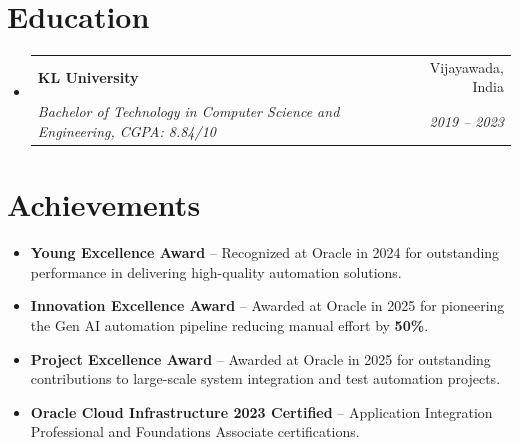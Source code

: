 \documentclass[letterpaper,11pt]{article}
\makeatletter
\newcommand{\resumeItem}[1]{
  \item\small{
    {#1 \vspace{-2pt}}
  }
}
\newcommand{\resumeSubheading}[4]{
  \vspace{-2pt}\item
    \begin{tabular*}{0.97\textwidth}[t]{l@{\extracolsep{\fill}}r}
      \textbf{#1} & #2 \\
      \textit{\small#3} & \textit{\small #4} \\
    \end{tabular*}\vspace{-7pt}
}
\newcommand{\resumeSubHeadingListStart}{\begin{itemize}[leftmargin=0.15in, label={}]}
\newcommand{\resumeSubHeadingListEnd}{\end{itemize}}
\newcommand{\resumeItemListStart}{\begin{itemize}}
\newcommand{\resumeItemListEnd}{\end{itemize}\vspace{-5pt}}
\makeatother
\begin{document}
\section{Education}
\resumeSubHeadingListStart
    \resumeSubheading
        {KL University}{Vijayawada, India}
        {Bachelor of Technology in Computer Science and Engineering, CGPA: 8.84/10}{2019 -- 2023}
\resumeSubHeadingListEnd

\section{Achievements}
\resumeItemListStart
    \resumeItem{\textbf{Young Excellence Award} -- Recognized at Oracle in 2024 for outstanding performance in delivering high-quality automation solutions.}
    \resumeItem{\textbf{Innovation Excellence Award} -- Awarded at Oracle in 2025 for pioneering the Gen AI automation pipeline reducing manual effort by \textbf{50\%}.}
    \resumeItem{\textbf{Project Excellence Award} -- Awarded at Oracle in 2025 for outstanding contributions to large-scale system integration and test automation projects.}
    \resumeItem{\textbf{Oracle Cloud Infrastructure 2023 Certified} -- Application Integration Professional and Foundations Associate certifications.}
\resumeItemListEnd
\end{document}
